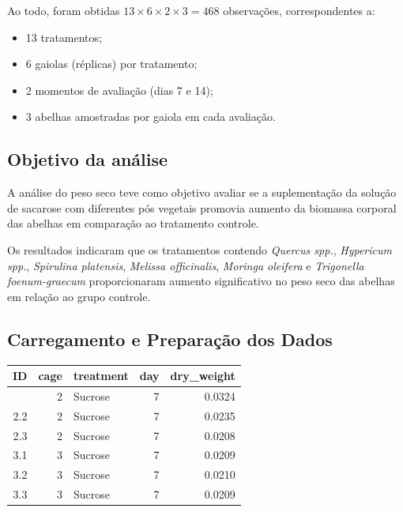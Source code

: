 \documentclass[
  brazilian,
  12pt,
  a4paper,
]{article}
\newenvironment{Shaded}{\begin{snugshade}}{\end{snugshade}}
\newcommand{\AttributeTok}[1]{\textcolor[rgb]{0.40,0.45,0.13}{#1}}
\newcommand{\DecValTok}[1]{\textcolor[rgb]{0.68,0.00,0.00}{#1}}
\newcommand{\FunctionTok}[1]{\textcolor[rgb]{0.28,0.35,0.67}{#1}}
\newcommand{\NormalTok}[1]{\textcolor[rgb]{0.00,0.46,0.62}{#1}}
\newcommand{\OtherTok}[1]{\textcolor[rgb]{0.00,0.46,0.62}{#1}}
\newcommand{\SpecialCharTok}[1]{\textcolor[rgb]{0.37,0.37,0.37}{#1}}
\newcommand{\StringTok}[1]{\textcolor[rgb]{0.13,0.47,0.30}{#1}}
\begin{document}
Ao todo, foram obtidas \(13 \times 6 \times 2 \times 3 = 468\)
observações, correspondentes a:

\begin{itemize}
    \item 13 tratamentos;
    \item 6 gaiolas (réplicas) por tratamento;
    \item 2 momentos de avaliação (dias 7 e 14);
    \item 3 abelhas amostradas por gaiola em cada avaliação.
\end{itemize}

\subsection{Objetivo da análise}

A análise do peso seco teve como objetivo avaliar se a suplementação da
solução de sacarose com diferentes pós vegetais promovia aumento da
biomassa corporal das abelhas em comparação ao tratamento controle.

Os resultados indicaram que os tratamentos contendo
\textit{Quercus spp.}, \textit{Hypericum spp.},
\textit{Spirulina platensis}, \textit{Melissa officinalis},
\textit{Moringa oleifera} e \textit{Trigonella foenum-graecum}
proporcionaram aumento significativo no peso seco das abelhas em relação
ao grupo controle.

\subsection{Carregamento e Preparação dos
Dados}\label{carregamento-e-preparauxe7uxe3o-dos-dados-1}

\begin{Shaded}
\end{Shaded}

\begin{longtable}[]{@{}rrlrr@{}}
\toprule\noalign{}
ID & cage & treatment & day & dry\_weight \\
\midrule\noalign{}
\endhead
\bottomrule\noalign{}
\endlastfoot
2.1 & 2 & Sucrose & 7 & 0.0324 \\
2.2 & 2 & Sucrose & 7 & 0.0235 \\
2.3 & 2 & Sucrose & 7 & 0.0208 \\
3.1 & 3 & Sucrose & 7 & 0.0209 \\
3.2 & 3 & Sucrose & 7 & 0.0210 \\
3.3 & 3 & Sucrose & 7 & 0.0209 \\
\end{longtable}
\end{document}
